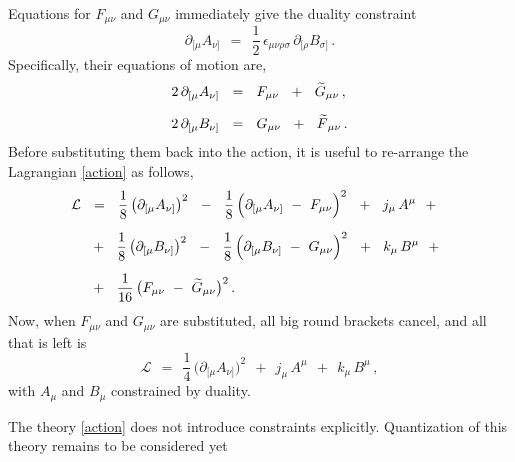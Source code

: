 \documentclass[epsfig,12pt]{article}
\def\beq{\begin{equation}}
\def\eeq{\end{equation}}
\newcommand{\cell}{{\mathcal L}}
\newcommand{\p}{\partial}
\newcommand{\wt}{\widetilde}
\begin{document}
	Equations for $ F_{\mu\nu} $ and $ G_{\mu\nu} $ immediately give the duality constraint
\beq
	\p_{[\mu} A_{\nu]}    ~~=~~    \frac{1}{2}\,\epsilon_{\mu\nu\rho\sigma}\, \p_{[\rho} B_{\sigma]}\,.
\eeq
	Specifically, their equations of motion are,
\begin{align}
%
\notag
	2\, \p_{[\mu} A_{\nu]}    & ~~=~~    F_{\mu\nu}  ~~+~~  \wt G{}_{\mu\nu}\,,
	\\[2mm]
%
\label{eq-motion}
	2\, \p_{[\mu} B_{\nu]}    & ~~=~~    G_{\mu\nu}  ~~+~~  \wt F{}_{\mu\nu}\,.
\end{align}
	Before substituting them back into the action, it is useful to re-arrange the Lagrangian \eqref{action} as follows,
\begin{align}
%
\notag
	\cell    & ~~=~~    \frac{1}{8}\, \big( \p_{[\mu} A_{\nu]} \big)^2  ~~-~~  
			    \frac{1}{8}\, \Big( \p_{[\mu} A_{\nu]} ~-~ F_{\mu\nu} \Big)^2  ~~+~~  j_\mu\, A^\mu  ~~+~~
	\\[2mm]
%
	&
		   ~~+~~    \frac{1}{8}\, \big( \p_{[\mu} B_{\nu]} \big)^2  ~~-~~
			    \frac{1}{8}\, \Big( \p_{[\mu} B_{\nu]} ~-~ G_{\mu\nu} \Big)^2  ~~+~~  k_\mu\, B^\mu  ~~+~~
	\\[2mm]
%
\notag
	&
	           ~~+~~    \frac{1}{16}\, \big( F_{\mu\nu} ~-~ \wt G{}_{\mu\nu} \big)^2\,.
\end{align}
	Now, when $ F_{\mu\nu} $ and $ G_{\mu\nu} $ are substituted, 
	all big round brackets cancel,
	and all that is left is
\beq
	\cell    ~~=~~    \frac{1}{4}\, \big( \p_{[\mu} A_{\nu]} \big)^2  ~~+~~  j_\mu\, A^\mu    ~~+~~  k_\mu\, B^\mu\,,
\eeq
	with $ A_\mu $ and $ B_\mu $ constrained by duality.

	The theory \eqref{action} does not introduce constraints explicitly. 
	Quantization of this theory remains to be considered yet
\end{document}
